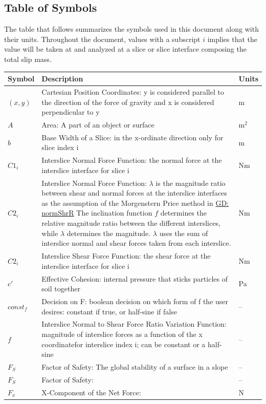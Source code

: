 \documentclass[12pt]{article}
\begin{document}
\subsection{Table of Symbols}
\label{Sec:ToS}
The table that follows summarizes the symbols used in this document along with their units. Throughout the document, values with a subscript $i$ implies that the value will be taken at and analyzed at a slice or slice interface composing the total slip mass.
\begin{longtabu}{l X[l] l}
\toprule
Symbol & Description & Units
\\
\midrule
$(x,y)$ & Cartesian Position Coordinates: y is considered parallel to the direction of the force of gravity and x is considered perpendicular to y & m
\\
$A$ & Area: A part of an object or surface & $\text{m}^{2}$
\\
$b$ & Base Width of a Slice: in the x-ordinate direction only for slice index i & m
\\
${C1_{i}}$ & Interslice Normal Force Function: the normal force at the interslice interface for slice i & Nm
\\
${C2_{i}}$ & Interslice Normal Force Function: $λ$ is the magnitude ratio between shear and normal forces at the interslice interfaces as the assumption of the Morgenstern Price method in \hyperref[GD:normShrR]{GD: normShrR} The inclination function $f$ determines the relative magnitude ratio between the different interslices, while $λ$ determines the magnitude. $λ$ uses the sum of interslice normal and shear forces taken from each interslice. & Nm
\\
${C2_{i}}$ & Interslice Shear Force Function: the shear force at the interslice interface for slice i & Nm
\\
$c'$ & Effective Cohesion: internal pressure that sticks particles of soil together & Pa
\\
$const_f$ & Decision on F: boolean decision on which form of f the user desires: constant if true, or half-sine if false & --
\\
$f$ & Interslice Normal to Shear Force Ratio Variation Function: magnitude of interslice forces as a function of the x coordinatefor interslice index i; can be constant or a half-sine & --
\\
${F_{S}}$ & Factor of Safety: The global stability of a surface in a slope & --
\\
${F_{S}}$ & Factor of Safety: & --
\\
${F_{x}}$ & X-Component of the Net Force:  & N

\end{longtabu}
\end{document}
